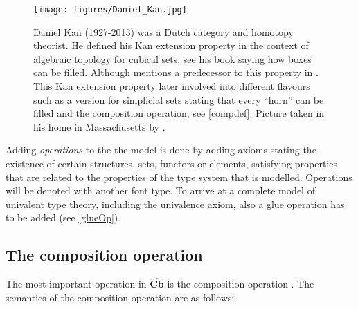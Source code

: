 \documentclass[12pt,a4paper,twoside,xetex]{book} %
\newcommand{\keyword}[1]{\emph{#1}\index{#1}}
\newcommand{\psh}[1]{\widehat{#1}}
\newcommand{\cube}[0]{\textbf{Cb}}
\begin{document}
\begin{figure}
\begin{centering}
\texttt{[image: figures/Daniel\_Kan.jpg]}
\par\end{centering}
\caption{\label{fig:Kan}Daniel Kan (1927-2013) was a Dutch category and homotopy theorist. He defined his Kan extension property  in the context of algebraic 
topology for cubical sets, see his book \cite{Kan1955} saying how boxes can be 
filled. Although \cite{Coquand2019} mentions a predecessor to this property in 
\cite{Eilenberg1939}. This Kan extension property later involved into different 
flavours such as a version for simplicial sets stating that every ``horn'' can 
be filled and the composition operation, see \cref{compdef}. Picture taken in his home in 
Massachusetts by \cite{Kan2005}.}
\end{figure}

Adding \keyword{operations} to the the model is done by adding axioms stating 
the existence of certain structures, sets, functors or elements, satisfying 
properties that are related to the properties of the type system that is 
modelled. Operations will be denoted with another font type. To arrive at a 
complete model of univalent type theory, including the univalence axiom, also a 
glue operation has to be added (see \cref{glueOp}). 

\subsection{The composition operation}

The most important operation in $\psh{\cube}$ is the composition operation 
\cite{Orton2019}. The semantics of the composition operation are as follows:
\end{document}
